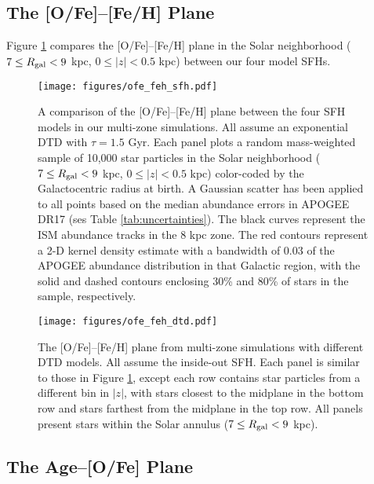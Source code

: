 \documentclass[twocolumn,twocolappendix,linenumbers]{aastex631}
\begin{document}
\subsection{The [O/Fe]--[Fe/H] Plane}
\label{sec:ofe-feh}

Figure \ref{fig:ofe-feh-sfh} compares the [O/Fe]--[Fe/H] plane in the Solar neighborhood ($7\leq R_{\rm gal}<9$ kpc, $0\leq|z|<0.5$ kpc) between our four model SFHs. 

\begin{figure}
    \centering
    \texttt{[image: figures/ofe\_feh\_sfh.pdf]}
    \caption{A comparison of the [O/Fe]--[Fe/H] plane between the four SFH models in our multi-zone simulations. All assume an exponential DTD with $\tau=1.5$ Gyr. Each panel plots a random mass-weighted sample of 10,000 star particles in the Solar neighborhood ($7\leq R_{\rm gal}<9$ kpc, $0\leq|z|<0.5$ kpc) color-coded by the Galactocentric radius at birth. A Gaussian scatter has been applied to all points based on the median abundance errors in APOGEE DR17 (ses Table \ref{tab:uncertainties}). The black curves represent the ISM abundance tracks in the 8 kpc zone. The red contours represent a 2-D kernel density estimate with a bandwidth of 0.03 of the APOGEE abundance distribution in that Galactic region, with the solid and dashed contours enclosing 30\% and 80\% of stars in the sample, respectively.}
    \label{fig:ofe-feh-sfh}
\end{figure}

\begin{figure*}
    \centering
    \texttt{[image: figures/ofe\_feh\_dtd.pdf]}
    \caption{The [O/Fe]--[Fe/H] plane from multi-zone simulations with different DTD models. All assume the inside-out SFH. Each panel is similar to those in Figure \ref{fig:ofe-feh-sfh}, except each row contains star particles from a different bin in $|z|$, with stars closest to the midplane in the bottom row and stars farthest from the midplane in the top row. All panels present stars within the Solar annulus ($7\leq R_{\rm gal}<9$ kpc).}
    \label{fig:ofe-feh-dtd}
\end{figure*}

\subsection{The Age--[O/Fe] Plane}
\label{sec:age-ofe}
\end{document}
